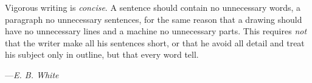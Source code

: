\documentclass[20pt,a4paper]{article}
\begin{document}
\setmainfont[Language=English]{Gentium Book Basic}
\renewcommand{\epigraphsize}{\small}
\setlength{\epigraphwidth}{1.0\textwidth}

\epigraph
{
    Vigorous writing is \emph{concise}. A sentence should contain no unnecessary words, a paragraph no unnecessary sentences, for the same reason that a drawing should have no unnecessary lines and a machine no unnecessary parts. This requires \emph{not} that the writer make all his sentences short, or that he avoid all detail and treat his subject only in outline, but that every word tell.
}
{
    ---\textit{E. B. White}
}
\end{document}
